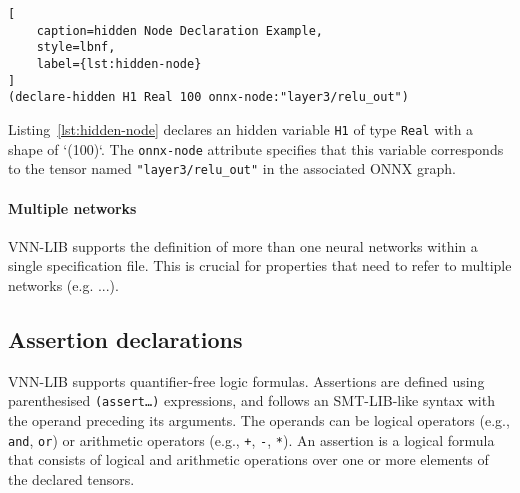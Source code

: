 \begin{lstlisting}[
    caption=hidden Node Declaration Example, 
    style=lbnf,
    label={lst:hidden-node}
]
(declare-hidden H1 Real 100 onnx-node:"layer3/relu_out") 
\end{lstlisting}

Listing~\ref{lst:hidden-node} declares an hidden variable \texttt{H1} of type \texttt{Real} with a shape of `(100)`. The \texttt{onnx-node} attribute 
specifies that this variable corresponds to the tensor named \texttt{"layer3/relu\_out"} in the associated ONNX graph. 

\paragraph{Multiple networks}

VNN-LIB supports the definition of more than one neural networks within a single specification file. This is crucial for properties that need to refer to
multiple networks (e.g. ...). 


\subsection{Assertion declarations}
VNN-LIB supports quantifier-free logic formulas. Assertions are defined using parenthesised \texttt{(assert\ldots)} expressions, and follows an SMT-LIB-like syntax with the 
operand preceding its arguments. The operands can be logical operators (e.g., \texttt{and}, \texttt{or}) or arithmetic operators (e.g., \texttt{+}, \texttt{-}, \texttt{*}).
An assertion is a logical formula that consists of logical and arithmetic operations over one or more elements of the declared tensors.

